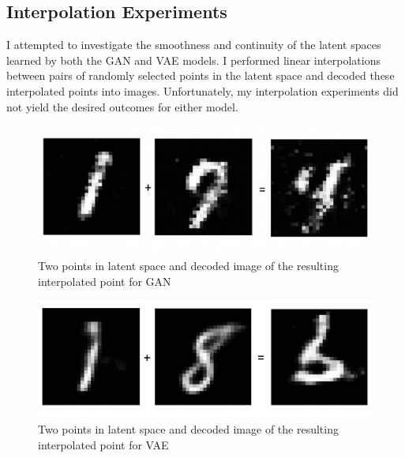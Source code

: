 \documentclass{article}
\begin{document}
\subsection{Interpolation Experiments}

I attempted to investigate the smoothness and continuity of the latent spaces learned by both the GAN and VAE models. I performed linear interpolations between pairs of randomly selected points in the latent space and decoded these interpolated points into images. Unfortunately, my interpolation experiments did not yield the desired outcomes for either model.

\begin{figure}[ht]
\vskip 0.2in
\begin{center}
\centerline{\includegraphics[width=\columnwidth]{images/gan_interpolation.png}}
\caption{Two points in latent space and decoded image of the resulting interpolated point for GAN }
\label{gan-interpolation}
\end{center}
\vskip -0.2in
\end{figure}

\begin{figure}[ht]
\vskip 0.2in
\begin{center}
\centerline{\includegraphics[width=\columnwidth]{images/vae_interpolation.png}}
\caption{Two points in latent space and decoded image of the resulting interpolated point for VAE }
\label{vae-interpolation}
\end{center}
\vskip -0.2in
\end{figure}
\end{document}
